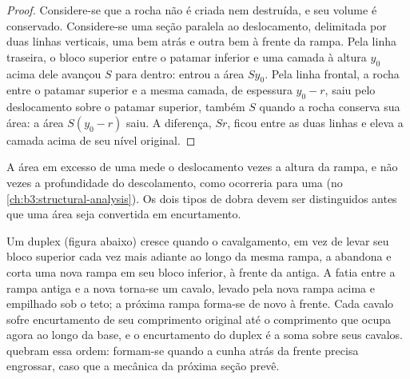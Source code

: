 \begin{proof}
Considere-se que a rocha não é criada nem destruída, e seu volume é conservado. Considere-se uma seção
paralela ao deslocamento, delimitada por duas linhas verticais, uma bem atrás e outra bem
à frente da rampa. Pela linha traseira, o bloco superior entre o patamar inferior e uma camada
à altura $y_0$ acima dele avançou $S$ para dentro: entrou a área
$Sy_0$. Pela linha frontal, a rocha entre o patamar superior e a
mesma camada, de espessura $y_0 - r$, saiu pelo deslocamento sobre o
patamar superior, também $S$ quando a rocha conserva sua área: a área $S(y_0 - r)$
saiu. A diferença, $Sr$, ficou entre as duas linhas e eleva
a camada acima de seu nível original.
\end{proof}

A área em excesso de uma  mede o deslocamento vezes a altura da
rampa, e não vezes a profundidade do descolamento, como ocorreria para uma
 (no \cref{ch:b3:structural-analysis}). Os dois tipos de dobra
devem ser distinguidos antes que uma área seja convertida em encurtamento.


Um duplex (figura abaixo) cresce quando o cavalgamento, em vez de levar seu bloco superior cada vez mais
adiante ao longo da mesma rampa, a abandona e corta uma nova rampa em seu bloco inferior,
à frente da antiga. A fatia entre a rampa antiga e a nova torna-se um
cavalo, levado pela nova rampa acima e empilhado sob o teto; a próxima rampa
forma-se de novo à frente. Cada cavalo sofre encurtamento de seu comprimento original até o
comprimento que ocupa agora ao longo da base, e o encurtamento do duplex é
a soma sobre seus cavalos.  quebram essa ordem: formam-se
quando a cunha atrás da frente precisa engrossar, caso que a mecânica da
próxima seção prevê.

